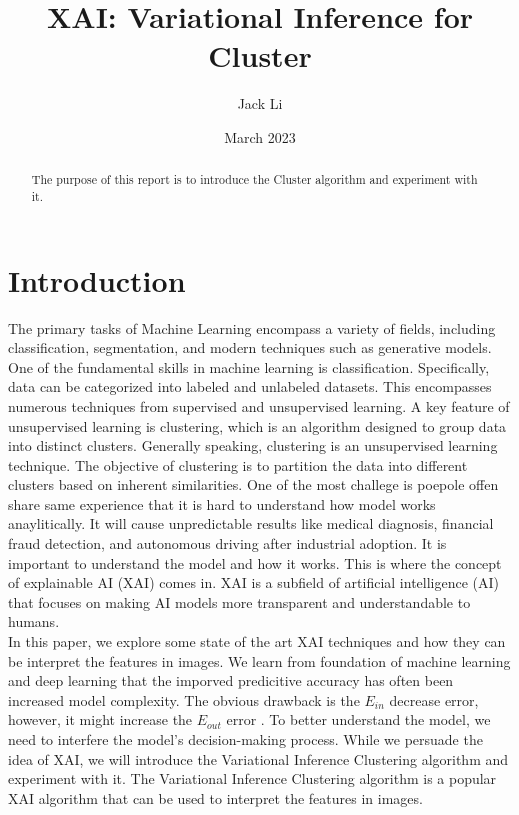 \documentclass[12pt]{article}
\title{XAI: Variational Inference for Cluster}
\author{Jack Li}
\date{March 2023}
\begin{document}
\maketitle

\begin{abstract}
The purpose of this report is to introduce the Cluster algorithm and experiment with it.
\end{abstract}
\section{Introduction}


The primary tasks of Machine Learning encompass a variety of fields, including classification, segmentation, and modern techniques such as generative models. 
One of the fundamental skills in machine learning is classification. Specifically, data can be categorized into labeled and unlabeled datasets. 
This encompasses numerous techniques from supervised and unsupervised learning. A key feature of unsupervised learning is clustering, which is an algorithm designed to group data into distinct clusters.
Generally speaking, clustering is an unsupervised learning technique. The objective of clustering is to partition the data into different clusters based on inherent similarities.
One of the most challege is poepole offen share same experience that it is hard to understand how model works anaylitically.
It will cause unpredictable results like medical diagnosis, financial fraud detection, and autonomous driving after industrial adoption. 
It is important to understand the model and how it works. This is where the concept of explainable AI (XAI) comes in. XAI is a subfield of artificial intelligence (AI) that focuses on making AI models more transparent and understandable to humans.\\ 

In this paper, we explore some state of the art XAI techniques and how they can be interpret the features in images. 
We learn from foundation of machine learning and deep learning that the imporved predicitive accuracy has often been increased model complexity. 
The obvious drawback is the $E_{in}$ decrease error, however, it might increase the $E_{out}$ error \cite{Shalev-Shwartz2014, Devroye1996, Hastie2017}.
To better understand the model, we need to interfere the model's decision-making process.
While we persuade the idea of XAI, we will introduce the Variational Inference Clustering algorithm and experiment with it.
The Variational Inference Clustering algorithm is a popular XAI algorithm that can be used to interpret the features in images. 
\end{document}
